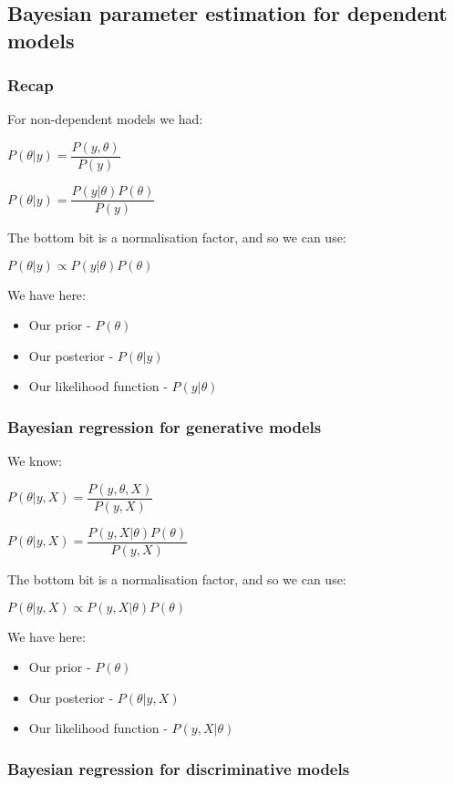 
\subsection{Bayesian parameter estimation for dependent models}

\subsubsection{Recap}

For non-dependent models we had:

\(P(\theta |y)=\dfrac{P(y, \theta)}{P(y)}\)

\(P(\theta |y)=\dfrac{P(y| \theta)P(\theta )}{P(y)}\)

The bottom bit is a normalisation factor, and so we can use:

\(P(\theta |y)\propto P(y| \theta)P(\theta )\)

We have here:

\begin{itemize}
\item Our prior - \(P(\theta )\)
\item Our posterior - \(P(\theta |y)\)
\item Our likelihood function - \(P(y| \theta)\)
\end{itemize}

\subsubsection{Bayesian regression for generative models}

We know:

\(P(\theta |y,X)=\dfrac{P(y, \theta, X )}{P(y, X)}\)

\(P(\theta |y,X)=\dfrac{P(y, X |\theta )P(\theta )}{P(y, X)}\)

The bottom bit is a normalisation factor, and so we can use:

\(P(\theta |y,X)\propto P(y, X| \theta)P(\theta)\)

We have here:

\begin{itemize}
\item Our prior - \(P(\theta )\)
\item Our posterior - \(P(\theta |y,X)\)
\item Our likelihood function - \(P(y, X| \theta )\)
\end{itemize}

\subsubsection{Bayesian regression for discriminative models}


